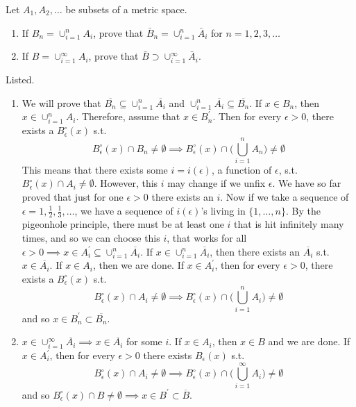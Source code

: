 \documentclass{article}
\begin{document}
    \begin{exercise}[Rudin 2.7]
    Let $A_1, A_2, \ldots$ be subsets of a metric space. 
    \begin{enumerate}
        \item If $B_n = \cup_{i=1}^n A_i$, prove that $\bar{B}_n = \cup_{i=1}^n \bar{A}_i$ for $n = 1, 2, 3, \ldots$ 
        \item If $B = \cup_{i=1}^\infty A_i$, prove that $\bar{B} \supset \cup_{i=1}^\infty \bar{A}_i$. 
    \end{enumerate}
    \end{exercise}
    \begin{solution}
    Listed. 
    \begin{enumerate}
        \item We will prove that $\overline{B_n} \subseteq \cup_{i=1}^n \overline{A_i}$ and $\cup_{i=1}^n \overline{A_i} \subseteq \overline{B_n}$. If $x \in B_n$, then $x \in \cup_{i=1}^n A_i$. Therefore, assume that $x \in B_n^\prime$. Then for every $\epsilon > 0$, there exists a $B_\epsilon^\circ (x)$ s.t. 
        \[B_\epsilon^\circ (x) \cap B_n \neq \emptyset \implies B_\epsilon^\circ (x) \cap \bigg( \bigcup_{i=1}^n A_n \bigg) \neq \emptyset \]
        This means that there exists some $i = i(\epsilon)$, a function of $\epsilon$, s.t. $B_\epsilon^\circ (x) \cap A_i \neq \emptyset$. However, this $i$ may change if we unfix $\epsilon$. We have so far proved that just for one $\epsilon > 0$ there exists an $i$. Now if we take a sequence of $\epsilon = 1, \frac{1}{2}, \frac{1}{3}, \ldots$, we have a sequence of $i(\epsilon)$'s living in $\{1, \ldots, n\}$. By the pigeonhole principle, there must be at least one $i$ that is hit infinitely many times, and so we can choose this $i$, that works for all $\epsilon > 0 \implies x \in A_i^\prime \subseteq \cup_{i=1}^n \overline{A_i}$. If $x \in \cup_{i=1}^n \overline{A_i}$, then there exists an $\overline{A_i}$ s.t. $x \in \overline{A_i}$. If $x \in A_i$, then we are done. If $x \in A_i^\prime$, then for every $\epsilon > 0$, there exists a $B_\epsilon^\circ (x)$ s.t. 
        \[B_\epsilon^\circ (x) \cap A_i \neq \emptyset \implies B_\epsilon^\circ (x) \cap \bigg( \bigcup_{i=1}^n A_i \bigg) \neq \emptyset\]
        and so $x \in B_n^\prime \subset \overline{B_n}$. 

        \item $x \in \cup_{i=1}^\infty \overline{A_i} \implies x \in \overline{A_i}$ for some $i$. If $x \in A_i$, then $x \in B$ and we are done. If $x \in A_i^\prime$, then for every $\epsilon > 0$ there exists $B_\epsilon (x) $ s.t. 
        \[B_\epsilon^\circ (x) \cap A_i \neq \emptyset \implies B_\epsilon^\circ (x) \cap \bigg( \bigcup_{i=1}^\infty A_i \bigg) \neq \emptyset\] 
        and so $B_\epsilon^\circ (x) \cap B \neq \emptyset \implies x \in B^\prime \subset \overline{B}$. 
    \end{enumerate}
    \end{solution}
\end{document}
